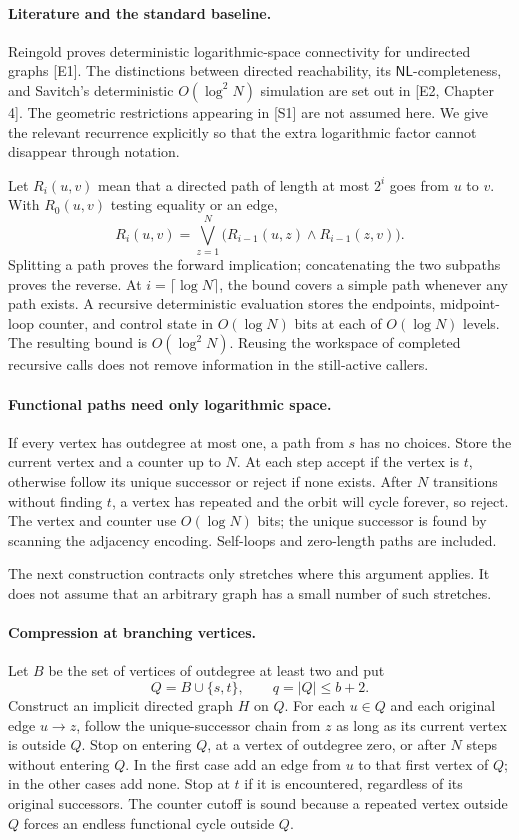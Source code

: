 \documentclass[11pt]{article}
\begin{document}
\paragraph{Literature and the standard baseline.}
Reingold proves deterministic logarithmic-space connectivity for undirected graphs [E1]. The distinctions between directed reachability, its $\mathsf{NL}$-completeness, and Savitch's deterministic $O(\log^2 N)$ simulation are set out in [E2, Chapter 4]. The geometric restrictions appearing in [S1] are not assumed here. We give the relevant recurrence explicitly so that the extra logarithmic factor cannot disappear through notation.

Let $R_i(u,v)$ mean that a directed path of length at most $2^i$ goes from $u$ to $v$. With $R_0(u,v)$ testing equality or an edge,
\[
 R_i(u,v)=\bigvee_{z=1}^{N}
     \bigl(R_{i-1}(u,z)\wedge R_{i-1}(z,v)\bigr).
 \tag{99.2}
\]
Splitting a path proves the forward implication; concatenating the two subpaths proves the reverse. At $i=\lceil\log N\rceil$, the bound covers a simple path whenever any path exists. A recursive deterministic evaluation stores the endpoints, midpoint-loop counter, and control state in $O(\log N)$ bits at each of $O(\log N)$ levels. The resulting bound is $O(\log^2 N)$. Reusing the workspace of completed recursive calls does not remove information in the still-active callers.

\paragraph{Functional paths need only logarithmic space.}
If every vertex has outdegree at most one, a path from $s$ has no choices. Store the current vertex and a counter up to $N$. At each step accept if the vertex is $t$, otherwise follow its unique successor or reject if none exists. After $N$ transitions without finding $t$, a vertex has repeated and the orbit will cycle forever, so reject. The vertex and counter use $O(\log N)$ bits; the unique successor is found by scanning the adjacency encoding. Self-loops and zero-length paths are included.

The next construction contracts only stretches where this argument applies. It does not assume that an arbitrary graph has a small number of such stretches.

\paragraph{Compression at branching vertices.}
Let $B$ be the set of vertices of outdegree at least two and put
\[
 Q=B\cup\{s,t\},\qquad q=|Q|\le b+2.
\]
Construct an implicit directed graph $H$ on $Q$. For each $u\in Q$ and each original edge $u\to z$, follow the unique-successor chain from $z$ as long as its current vertex is outside $Q$. Stop on entering $Q$, at a vertex of outdegree zero, or after $N$ steps without entering $Q$. In the first case add an edge from $u$ to that first vertex of $Q$; in the other cases add none. Stop at $t$ if it is encountered, regardless of its original successors. The counter cutoff is sound because a repeated vertex outside $Q$ forces an endless functional cycle outside $Q$.
\end{document}
